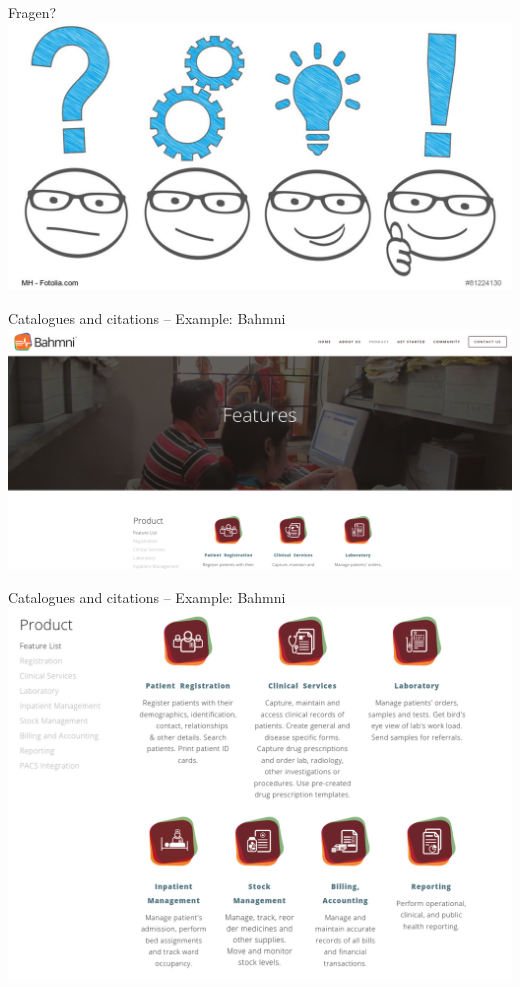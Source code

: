 \documentclass[aspectratio=1610,12pt]{beamer}
\begin{document}
\begin{frame}{Fragen?}
  \centering
  \vspace{-0.5cm}
  \includegraphics[width=\textwidth]{img/fragen.png}
\end{frame}

\begin{frame}{Catalogues and citations -- Example: Bahmni}
  \includegraphics[width=\textwidth]{img/bahmni-example1.png}
\end{frame}

\begin{frame}{Catalogues and citations -- Example: Bahmni}
  \centering
  \includegraphics[height=.8\textheight]{img/bahmni-example2.png}
\end{frame}
\end{document}
